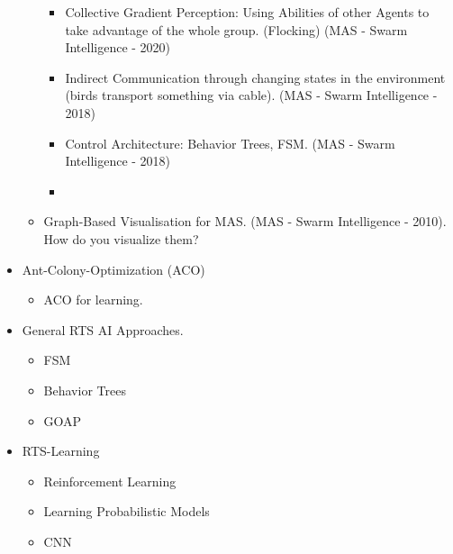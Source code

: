 \begin{itemize}[noitemsep,nolistsep]
\begin{itemize}[noitemsep,nolistsep]
\begin{itemize}[noitemsep,nolistsep]
			\item Collective Gradient Perception: Using Abilities of other Agents to take advantage of the whole group. (Flocking) (MAS - Swarm Intelligence - 2020)
			\item Indirect Communication through changing states in the environment (birds transport something via cable). (MAS - Swarm Intelligence - 2018)
			\item Control Architecture: Behavior Trees, FSM. (MAS - Swarm Intelligence - 2018)
			\item 
		\end{itemize}
		\item Graph-Based Visualisation for MAS. (MAS - Swarm Intelligence - 2010). How do you visualize them?
		
		
	\end{itemize}
	\item Ant-Colony-Optimization (ACO)
	\begin{itemize}[noitemsep,nolistsep]
		\item ACO for learning.
	\end{itemize}
	\item General RTS AI Approaches.
	\begin{itemize}[noitemsep,nolistsep]
		\item FSM
		\item Behavior Trees
		\item GOAP
	\end{itemize}
	\item RTS-Learning
	\begin{itemize}[noitemsep,nolistsep]
		\item Reinforcement Learning
		\item Learning Probabilistic Models
		\item CNN
	\end{itemize}
\end{itemize}
